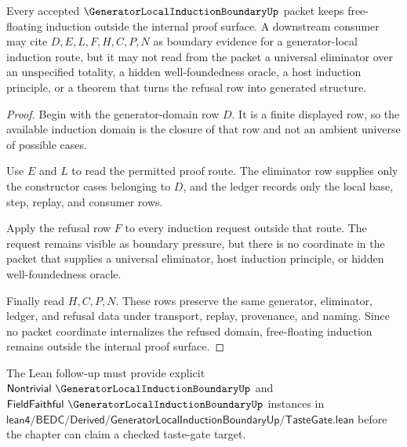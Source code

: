 \begin{theorem}
\label{thm:generator-local-induction-boundary-noninternalization}
Every accepted $\GeneratorLocalInductionBoundaryUp$ packet keeps free-floating induction outside the internal proof surface. A downstream consumer may cite $D,E,L,F,H,C,P,N$ as boundary evidence for a generator-local induction route, but it may not read from the packet a universal eliminator over an unspecified totality, a hidden well-foundedness oracle, a host induction principle, or a theorem that turns the refusal row into generated structure.
\end{theorem}
\begin{proof}
Begin with the generator-domain row $D$. It is a finite displayed row, so the available induction domain is the closure of that row and not an ambient universe of possible cases.

Use $E$ and $L$ to read the permitted proof route. The eliminator row supplies only the constructor cases belonging to $D$, and the ledger records only the local base, step, replay, and consumer rows.

Apply the refusal row $F$ to every induction request outside that route. The request remains visible as boundary pressure, but there is no coordinate in the packet that supplies a universal eliminator, host induction principle, or hidden well-foundedness oracle.

Finally read $H,C,P,N$. These rows preserve the same generator, eliminator, ledger, and refusal data under transport, replay, provenance, and naming. Since no packet coordinate internalizes the refused domain, free-floating induction remains outside the internal proof surface.
\end{proof}



The Lean follow-up must provide explicit $\mathsf{Nontrivial}\ \GeneratorLocalInductionBoundaryUp$ and $\mathsf{FieldFaithful}\ \GeneratorLocalInductionBoundaryUp$ instances in $\mathsf{lean4/BEDC/Derived/GeneratorLocalInductionBoundaryUp/TasteGate.lean}$ before the chapter can claim a checked taste-gate target.

